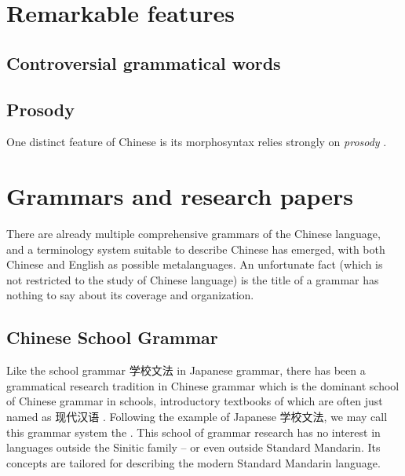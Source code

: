 \section{Remarkable features}

\subsection{Controversial grammatical words}

\subsection{Prosody}\label{sec:prosody-intro}

One distinct feature of Chinese is its morphosyntax relies strongly on \emph{prosody} \citep{feng2013}. 


\section{Grammars and research papers}

There are already multiple comprehensive grammars of the Chinese language, and a terminology system 
suitable to describe Chinese has emerged, with both Chinese and English as possible metalanguages. 
An unfortunate fact (which is not restricted to the study of Chinese language) is the title of a grammar
has nothing to say about its coverage and organization. 

\subsection{Chinese School Grammar}\label{sec:school-grammar}

Like the school grammar 学校文法 in Japanese grammar, there has been a grammatical research tradition 
in Chinese grammar which is the dominant school of Chinese grammar in schools, introductory textbooks of 
which are often just named as 现代汉语 \citep[e.g.][]{xianhan2004}. Following the example of Japanese 
学校文法, we may call this grammar system the .
This school of grammar research has no interest in languages outside the Sinitic family -- or even outside 
Standard Mandarin. Its concepts are tailored for describing the modern Standard Mandarin language. 

